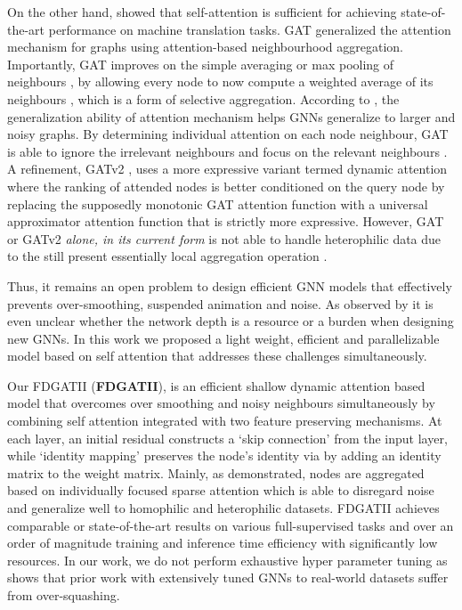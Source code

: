 \documentclass{article}
\begin{document}
On the other hand, \citet{vaswani2017attention} showed that self-attention is sufficient for achieving  state-of-the-art performance on machine translation tasks. GAT \cite{velivckovic2018graph} generalized the attention mechanism for graphs using attention-based neighbourhood aggregation. Importantly, GAT improves on the simple averaging or max pooling of neighbours \cite{kipf2016semi, hamilton2017inductive}, by allowing every node to now compute a weighted average of its neighbours \cite{brody2021attentive}, which is a form of selective aggregation. According to \citet{knyazev2019understanding}, the generalization ability of attention mechanism helps GNNs generalize to larger and noisy graphs. By determining individual attention on each node neighbour, GAT is able to ignore the irrelevant neighbours and focus on the relevant neighbours \cite{alon2020bottleneck}. A refinement, GATv2 \cite{brody2021attentive}, uses a more expressive variant termed dynamic attention where the ranking of attended nodes is better conditioned on the query node by replacing the supposedly monotonic GAT attention function with a universal approximator attention function that is strictly more expressive. However, GAT or GATv2 \textit{alone, in its current form} is not able to handle heterophilic data due to the still present essentially local aggregation operation \cite{liu2020non}.

Thus, it remains an open problem to design efficient GNN models that effectively prevents over-smoothing, suspended animation and noise. As observed by \citet{chen2020simple} it is even unclear whether the network depth is a resource or a burden when designing new GNNs. In this work we proposed a light weight, efficient and parallelizable model based on self attention that addresses these challenges simultaneously. 

Our \acrlong{FDGATII}  (\textbf{\acrshort{FDGATII}}), is an efficient shallow dynamic attention based model that overcomes over smoothing and noisy neighbours simultaneously by combining self attention integrated with two feature preserving mechanisms. At each layer, an initial residual constructs a ‘skip connection’ from the input layer, while ‘identity mapping’ preserves the node's identity via by adding an identity matrix to the weight matrix. Mainly, as demonstrated, nodes are aggregated based on individually focused sparse attention which is able to disregard noise and generalize well to homophilic and heterophilic datasets. FDGATII achieves comparable or state-of-the-art results on various full-supervised tasks and over an order of magnitude training and inference time efficiency with significantly low resources. In our work, we do not perform exhaustive hyper parameter tuning as \citet{alon2020bottleneck} shows that prior work with extensively tuned GNNs to real-world datasets suffer from over-squashing.
\end{document}
